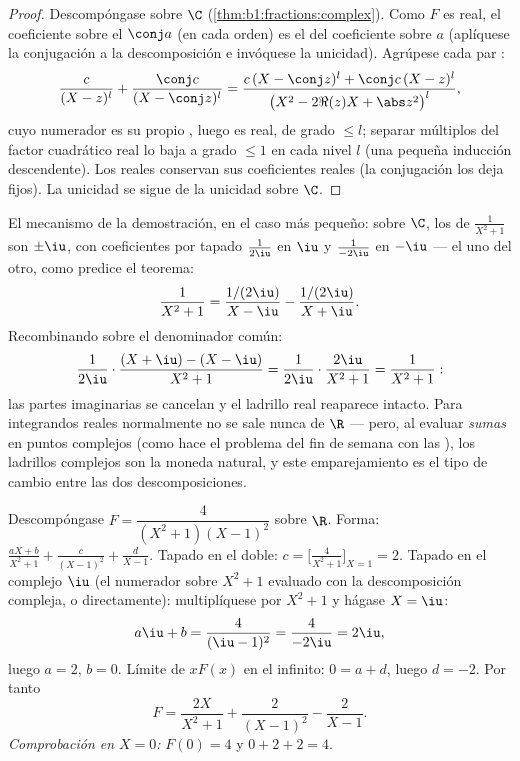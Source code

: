 \begin{proof}
Descompóngase sobre $\C$ (\cref{thm:b1:fractions:complex}). Como $F$ es
real, el coeficiente sobre el  $\conj a$ (en cada orden) es el
 del coeficiente sobre $a$ (aplíquese la conjugación a la
descomposición e invóquese la unicidad). Agrúpese cada par :
\[
\frac{c}{(X - z)^l} + \frac{\conj c}{(X - \conj z)^l}
= \frac{c\,(X - \conj z)^l + \conj c\,(X - z)^l}{\bigl(X^2 - 2\Re(z)X
+ \abs z^2\bigr)^{l}},
\]
cuyo numerador es su propio , luego es real, de grado $\leq l$;
separar múltiplos del factor cuadrático real lo baja a grado $\leq 1$
en cada nivel $l$ (una pequeña inducción descendente). Los  reales
conservan sus coeficientes reales (la conjugación los deja fijos). La
unicidad se sigue de la unicidad sobre $\C$.
\end{proof}

\begin{example}\label{ex:b1:fractions:pairing}
El mecanismo de la demostración, en el caso más pequeño: sobre $\C$,
los  de $\frac1{X^2+1}$ son $\pm\iu$, con coeficientes por tapado
$\frac1{2\iu}$ en $\iu$ y $\frac1{-2\iu}$ en $-\iu$ ---  el
uno del otro, como predice el teorema:
\[
\frac{1}{X^2 + 1}
= \frac{1/(2\iu)}{X - \iu} - \frac{1/(2\iu)}{X + \iu} .
\]
Recombinando sobre el denominador común:
\[
\frac{1}{2\iu}\cdot\frac{(X + \iu) - (X - \iu)}{X^2 + 1}
= \frac{1}{2\iu}\cdot\frac{2\iu}{X^2 + 1} = \frac{1}{X^2+1} :
\]
las partes imaginarias se cancelan y el ladrillo real reaparece
intacto. Para integrandos reales normalmente no se sale nunca de $\R$
--- pero, al evaluar \emph{sumas} en puntos complejos (como hace el
problema del fin de semana con las ), los ladrillos
complejos son la moneda natural, y este emparejamiento es el tipo de
cambio entre las dos descomposiciones.
\end{example}

\begin{example}\label{ex:b1:fractions:real}
Descompóngase $F = \dfrac{4}{(X^2+1)(X-1)^2}$ sobre $\R$. Forma:
$\frac{aX + b}{X^2 + 1} + \frac{c}{(X-1)^2} + \frac{d}{X - 1}$. Tapado
en el  doble: $c = \bigl[\frac{4}{X^2+1}\bigr]_{X=1} = 2$. Tapado
en el  complejo $\iu$ (el numerador sobre $X^2 + 1$ evaluado con la
descomposición compleja, o directamente): multiplíquese por $X^2 + 1$ y
hágase $X = \iu$:
\[
a\iu + b = \frac{4}{(\iu - 1)^2} = \frac{4}{-2\iu} = 2\iu ,
\]
luego $a = 2$, $b = 0$. Límite de $xF(x)$ en el infinito: $0 = a + d$,
luego $d = -2$. Por tanto
\[
F = \frac{2X}{X^2+1} + \frac{2}{(X-1)^2} - \frac{2}{X-1} .
\]
\emph{Comprobación en $X = 0$:} $F(0) = 4$ y $0 + 2 + 2 = 4$.
\end{example}

